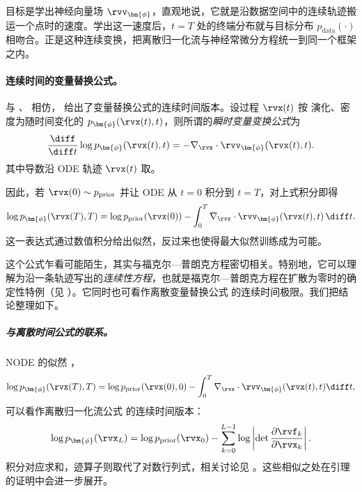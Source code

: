 目标是学出神经向量场 $\rvv_{\bm{\phi}}$，直观地说，它就是沿数据空间中的连续轨迹搬运一个点时的速度。学出这一速度后，$t=T$ 处的终端分布就与目标分布 $p_{\mathrm{data}}(\cdot)$ 相吻合。正是这种连续变换，把离散归一化流与神经常微分方程统一到同一个框架之内。


\paragraph{连续时间的变量替换公式。}
与 、 相仿，\citet{chen2018neural} 给出了变量替换公式的连续时间版本。设过程 $\rvx(t)$ 按  演化、密度为随时间变化的 $p_{\bm{\phi}}(\rvx(t),t)$，则所谓的\emph{瞬时变量变换公式}为
\[
\frac{\diff}{\diff t}
\log p_{\bm{\phi}}(\rvx(t),t)
=
-\nabla_{\rvx}\cdot
\rvv_{\bm{\phi}}(\rvx(t),t).
\]
其中导数沿 ODE 轨迹 $\rvx(t)$ 取。

因此，若 $\rvx(0)\sim p_{\mathrm{prior}}$ 并让 ODE 从 $t=0$ 积分到 $t=T$，对上式积分即得
\begin{align}\label{eq:NODE-likelihood}
\log p_{\bm{\phi}}(\rvx(T),T)
=
\log p_{\mathrm{prior}}(\rvx(0))
-
\int_0^T
\nabla_{\rvx}\cdot
\rvv_{\bm{\phi}}(\rvx(t),t)
\,\diff t.
\end{align}
这一表达式通过数值积分给出似然，反过来也使得最大似然训练成为可能。

这个公式乍看可能陌生，其实与福克尔—普朗克方程密切相关。特别地，它可以理解为沿一条轨迹写出的\emph{连续性方程}，也就是福克尔—普朗克方程在扩散为零时的确定性特例（见 ）。它同时也可看作离散变量替换公式  的连续时间极限。我们把结论整理如下。



\subparagraph{与离散时间公式的联系。}
NODE 的似然 ，
\[
\log p_{\bm{\phi}}(\rvx(T), T) = \log p_{\text{prior}}(\rvx(0), 0) - \int_0^T \nabla_\rvx \cdot \rvv_{\bm{\phi}}(\rvx(t), t) \diff t,
\]
可以看作离散归一化流公式  的连续时间版本：
\[
\log p_{\bm{\phi}}(\rvx_L) = \log p_{\text{prior}}(\rvx_0) - \sum_{k=0}^{L-1} \log \left| \det \frac{\partial \rvf_k}{\partial \rvx_k} \right|.
\]
积分对应求和，迹算子则取代了对数行列式，相关讨论见 。这些相似之处在引理的证明中会进一步展开。

